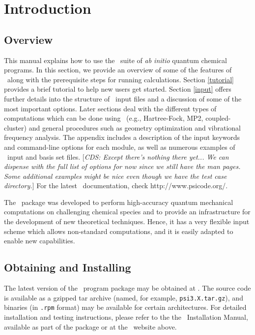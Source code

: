 \section{Introduction} \label{introduction}

\subsection{Overview}
This manual explains how to use the
\PSIthree\ suite of {\em ab initio} quantum chemical programs.  
In this section, we provide an overview of some
of the features of \PSIthree\ along with the prerequisite steps for
running calculations.  Section \ref{tutorial} provides a brief
tutorial to help new users get started.  Section \ref{input} offers
further details into the structure of \PSIthree\ input files
and a discussion of some of the most important options.
Later sections deal with the different types of computations which
can be done using \PSIthree\ (e.g., Hartree-Fock, MP2, coupled-cluster)
and general procedures such as geometry optimization
and vibrational frequency analysis.  
The appendix includes a description of
the input keywords and command-line options for each module, as well
as numerous examples of \PSIthree\ input and basis set files.
[{\em CDS: Except there's nothing there yet... We can dispense with the
full list of options for now since we still have the man pages.  Some
additional examples might be nice even though we have the test case 
directory.}]
For the latest \PSIthree\ documentation, check 
{http://www.psicode.org/}.

The \PSIthree\ package was developed to perform high-accuracy 
quantum mechanical computations on challenging chemical species
and to provide an infrastructure for the development of new
theoretical techniques.  Hence, it has a very flexible input
scheme which allows non-standard computations, and it is easily
adapted to enable new capabilities.

\subsection{Obtaining and Installing \PSIthree}
\label{installation}

The latest version of the \PSIthree\ program package may be obtained
at .
The source code is available as a gzipped tar archive (named, for
example, {\tt psi3.X.tar.gz}), and binaries (in {\tt .rpm} format) may
be available for certain architectures.  For detailed installation and
testing instructions, please refer to the the \PSIthree\
Installation Manual, available as part of the package or at the
\PSIthree\ website above.

